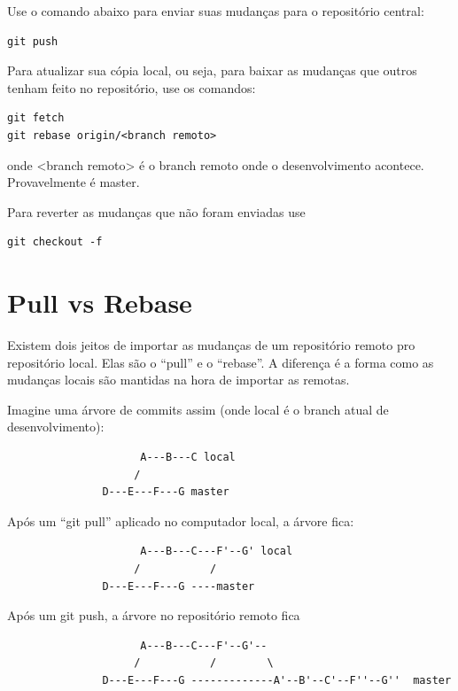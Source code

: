 \documentclass[12pt,brazil]{book}
\begin{document}
Use o comando abaixo para enviar suas mudanças para o repositório
central:

\begin{verbatim}
git push
\end{verbatim}

Para atualizar sua cópia local, ou seja, para baixar as mudanças que
outros tenham feito no repositório, use os comandos:

\begin{verbatim}
git fetch
git rebase origin/<branch remoto>
\end{verbatim}

onde <branch remoto> é o branch remoto onde o desenvolvimento
acontece. Provavelmente é master.

Para reverter as mudanças que não foram enviadas use

\begin{verbatim}
git checkout -f
\end{verbatim}


\section{Pull vs Rebase}

Existem dois jeitos de importar as mudanças de um repositório remoto
pro repositório local. Elas são o ``pull'' e o ``rebase''. A diferença
é a forma como as mudanças locais são mantidas na hora de importar as
remotas.

Imagine uma árvore de commits assim (onde local é o branch atual de desenvolvimento):

\begin{verbatim}
                     A---B---C local
                    /
               D---E---F---G master
\end{verbatim}

Após um ``git pull'' aplicado no computador local, a árvore fica:

\begin{verbatim}
                     A---B---C---F'--G' local
                    /           /
               D---E---F---G ----master
\end{verbatim}

Após um git push, a árvore no repositório remoto fica

\begin{verbatim}
                     A---B---C---F'--G'-- 
                    /           /        \
               D---E---F---G -------------A'--B'--C'--F''--G''  master
\end{verbatim}
\end{document}
